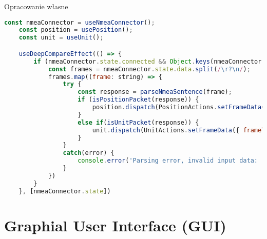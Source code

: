 \documentclass[skorowidz,skroty]{dyplomWEZUT}
\begin{document}
{Opracowanie własne}{\label{code: parse&dispatch}}
\begin{lstlisting}[language=JavaScript]
    const nmeaConnector = useNmeaConnector();
    const position = usePosition();
    const unit = useUnit();

    useDeepCompareEffect(() => {
        if (nmeaConnector.state.connected && Object.keys(nmeaConnector.state.data).length > 0) {
            const frames = nmeaConnector.state.data.split(/\r?\n/);
            frames.map((frame: string) => {
                try {
                    const response = parseNmeaSentence(frame);
                    if (isPositionPacket(response)) {
                        position.dispatch(PositionActions.setFrameData({ frameType: response.sentenceId, frameData: response }))
                    }
                    else if(isUnitPacket(response)) {
                        unit.dispatch(UnitActions.setFrameData({ frameType: response.sentenceId, frameData: response }))
                    }
                }
                catch(error) {
                    console.error('Parsing error, invalid input data: ', error)
                }
            })
        }
    }, [nmeaConnector.state])
\end{lstlisting}


\section{Graphial User Interface (GUI)}\label{sec: GUI}

\end{document}

